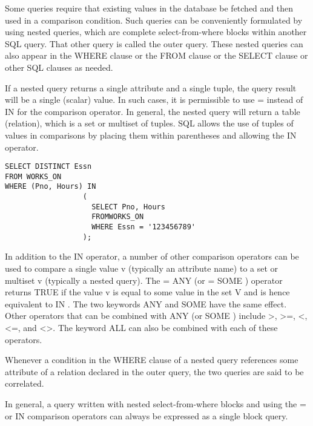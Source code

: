     \par Some queries require that existing values in the database be fetched and then used in a comparison condition. Such queries can be conveniently formulated by using nested queries, which are complete select-from-where blocks within another SQL query. That other query is called the outer query. These nested queries can also appear in the WHERE clause or the FROM clause or the SELECT clause or other SQL clauses as needed.
    \par If a nested query returns a single attribute and a single tuple, the query result will be a single (scalar) value. In such cases, it is permissible to use = instead of IN for the comparison operator. In general, the nested query will return a table (relation), which is a set or multiset of tuples. SQL allows the use of tuples of values in comparisons by placing them within
    parentheses and allowing the IN operator.
    \begin{verbatim}
SELECT DISTINCT Essn
FROM WORKS_ON
WHERE (Pno, Hours) IN
                  (
                    SELECT Pno, Hours
                    FROMWORKS_ON
                    WHERE Essn = '123456789'
                  );
    \end{verbatim}
    \par In addition to the IN operator, a number of other comparison operators can be used to compare a single value v (typically an attribute name) to a set or multiset v (typically a nested query). The = ANY (or = SOME ) operator returns TRUE if the value v is equal to some value in the set V and is hence equivalent to IN . The two keywords ANY and SOME have the same effect. Other operators that can be combined with ANY (or SOME ) include >, >=, <, <=, and <>. The keyword ALL can also be combined with each of these operators.

    \par Whenever a condition in the WHERE clause of a nested query references some attribute of a relation declared in the outer query, the two queries are said to be correlated.
    \par In general, a query written with nested select-from-where blocks and using the = or IN comparison operators can always be expressed as a single block query.

